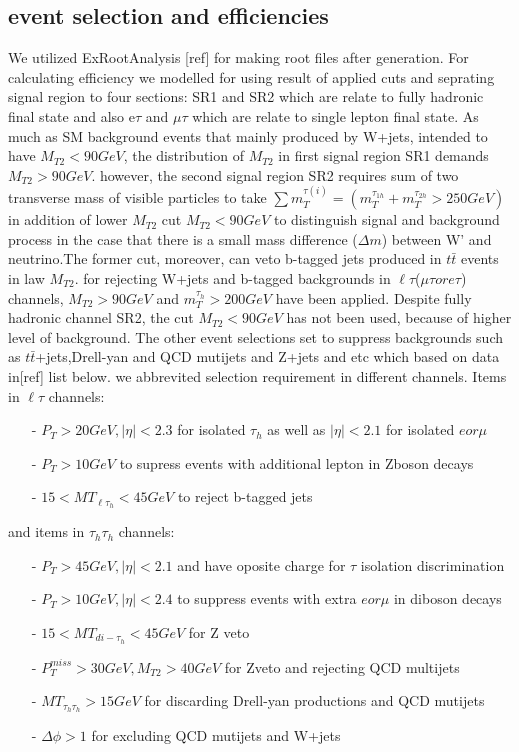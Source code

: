   \subsection{event selection and efficiencies}
 
 We utilized ExRootAnalysis [ref] for making root files after generation. For calculating efficiency we modelled \cite{CMS:2016saj} for using result of applied cuts and seprating signal region to four sections: SR1 and SR2 which are relate to fully hadronic final state and also e$\tau$ and $\mu\tau$ which are relate to single lepton final state. As much as SM background events that mainly produced by W+jets, intended to have $M_{T2}<90GeV$, the distribution of $M_{T2}$ in first signal region SR1 demands $M_{T2}>90GeV$. however, the second signal region SR2 requires sum of two transverse mass of visible particles to take $\sum{m^{\tau(i)}_T}=(m^{\tau_{1h}}_T + m^{\tau_{2h}}_T>250GeV)$ in addition of lower $M_{T2}$ cut $M_{T2}<90GeV$ to distinguish signal and background process in the case that there is a small mass difference ($\Delta m$) between W' and neutrino.The former cut, moreover, can veto b-tagged jets produced in $t{\bar{t}}$ events in law $M_{T2}$. 
 for rejecting W+jets and b-tagged backgrounds in $\ell\tau$($\mu\tau  or  e\tau$) channels, $M_{T2}>90GeV$ and $m^{\tau_{h}}_T>200 GeV$ have been applied. Despite fully hadronic channel SR2, the cut $M_{T2}<90GeV$ has not been used, because of higher level of background. The other event selections set to suppress backgrounds such as $t{\bar{t}}$+jets,Drell-yan and QCD mutijets and Z+jets and etc which based on data in[ref] list below. we abbrevited selection requirement in different channels. Items in $\ell\tau$ channels:
 
 \begin{itemize}
 	\item[-] $P_T>20GeV , |\eta|<2.3$ for isolated $\tau_{h}$ as well as $|\eta|<2.1$ for isolated $e or \mu$
 	\item[-] $P_T>10GeV$ to supress events with additional lepton in Zboson decays
 	\item[-] $15<{MT_{\ell{\tau_h}}}<45GeV$ to reject b-tagged jets 
 \end{itemize}
 
 and items in $\tau_{h}  \tau_{h}$ channels:
 
 \begin{itemize}
 	\item[-] $P_T>45GeV , |\eta|<2.1$ and have oposite charge for $\tau$ isolation discrimination
 	\item[-] $P_T>10GeV , |\eta|<2.4$ to suppress events with extra $e or \mu$ in diboson decays
 	\item[-] $15<{MT_{di-{\tau_h}}}<45GeV$ for Z veto
 	\item[-] $P^{miss}_T>30GeV, M_{T2}>40GeV$ for Zveto and rejecting QCD multijets 
 	\item[-] $MT_{\tau_h \tau_h}>15GeV$ for discarding Drell-yan productions and QCD mutijets
 	\item[-] $\Delta\phi>1$ for excluding QCD mutijets and W+jets
 \end{itemize}
 
